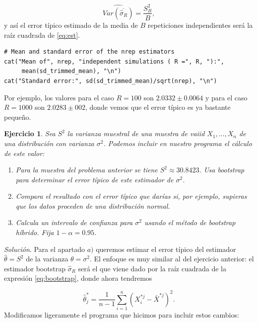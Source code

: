 \documentclass[12pt]{article}
\newtheorem{ejer}{Ejercicio}%
\begin{document}
\begin{equation}
  \label{eq:est}
\widehat{Var(\overline{\hat\sigma_R})} = \frac{S^2_B}{B},
\end{equation}
y así el error típico estimado de la media de $B$ repeticiones independientes será la raíz cuadrada de \eqref{eq:est}.

\begin{verbatim}
# Mean and standard error of the nrep estimators
cat("Mean of", nrep, "independent simulations ( R =", R, "):",
     mean(sd_trimmed_mean), "\n")
cat("Standard error:", sd(sd_trimmed_mean)/sqrt(nrep), "\n")
\end{verbatim}
Por ejemplo, los valores para el caso $R=100$ son $2.0332 \pm 0.0064$ y para el caso $R=1000$ son $2.0283 \pm 002$, donde vemos que el error típico es ya bastante pequeño.

\begin{ejer}
Sea $S^2$ la varianza muestral de una muestra de vaiid $X_1,\dots, X_n$ de una distribución con varianza $\sigma^2$. Podemos incluir en nuestro programa el cálculo de este valor:

\begin{enumerate}
  \item[a)] Para la muestra del problema anterior se tiene $S^2\approx 30.8423$. Usa bootstrap para determinar el error típico de este estimador de $\sigma^2$.
  \item[b)] Compara el resultado con el error típico que darías si, por ejemplo, supieras que los datos proceden de una distribución normal.
  \item[c)] Calcula un intervalo de confianza para $\sigma^2$ usando el método de bootstrap híbrido. Fija $1-\alpha=0.95$.
\end{enumerate}
\end{ejer}

\textit{Solución}. Para el apartado $a)$ queremos estimar el error típico del estimador $\hat\theta =S^2$ de la varianza $\theta=\sigma^2$. El enfoque es muy similar al del ejercicio anterior: el estimador bootstrap $\hat\sigma_R$ será el que viene dado por la raíz cuadrada de la expresión \eqref{eq:bootstrap}, donde ahora tendremos

\[
\hat\theta_j^* = \frac{1}{n-1} \sum_{i=1}^n \left( X_i^{*j} - \bar{X}^{*j}\right)^2.
\]
Modificamos ligeramente el programa que hicimos para incluir estos cambios:
\end{document}

